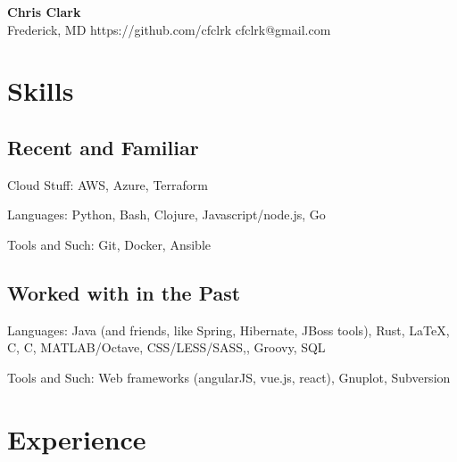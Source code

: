 \documentclass[a4paper,11pt]{article}
\newcommand{\CC}{C\nolinebreak\hspace{-.05em}\raisebox{.4ex}{\tiny\bf
    +}\nolinebreak\hspace{-.10em}\raisebox{.4ex}{\tiny\bf +}}
\def\CC{{C\nolinebreak[4]\hspace{-.05em}\raisebox{.4ex}{\tiny\bf ++}}}
\begin{document}
\begin{center}
  {\sffamily \huge \textbf{Chris Clark}} \\
  Frederick, MD \enspace\textopenbullet\enspace
  https://github.com/cfclrk \enspace\textopenbullet\enspace
  cfclrk@gmail.com
\end{center}

\vspace{-9pt}


  \section*{Skills}

  \begin{multicols}{2}
    \raggedright

    \subsection*{Recent and Familiar}

    Cloud Stuff: AWS, Azure, Terraform

    Languages: Python, Bash, Clojure, Javascript/node.js, Go

    Tools and Such: Git, Docker, Ansible

    \subsection*{Worked with in the Past}

    Languages: Java (and friends, like Spring, Hibernate, JBoss tools), Rust,
    \LaTeX, C, \CC, MATLAB/Octave, CSS/LESS/SASS,, Groovy, SQL

    Tools and Such: Web frameworks (angularJS, vue.js, react), Gnuplot,
    Subversion
    \vfill
    \columnbreak

  \end{multicols}


\vspace{-9pt}
\section*{Experience}
\end{document}
